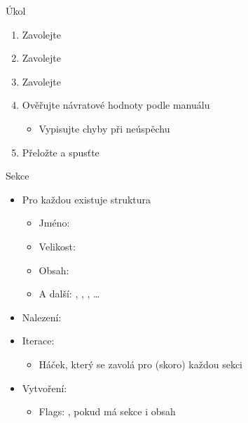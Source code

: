\begin{frame}{Úkol}

  \begin{enumerate}
    \item Zavolejte 
    \item Zavolejte 
    \item Zavolejte 

    \item Ověřujte návratové hodnoty podle manuálu
    \begin{itemize}
      \item Vypisujte chyby při neúspěchu
    \end{itemize}

    \item Přeložte a spusťte
  \end{enumerate}

\end{frame}

\begin{frame}{Sekce}

  \begin{itemize}
    \item Pro každou existuje struktura 
    \begin{itemize}
      \item Jméno: 
      \item Velikost: 
      \item Obsah: 
      \item A další: , , , \dots
    \end{itemize}

    \pause

    \item Nalezení: 

    \pause

    \item Iterace: 
    \begin{itemize}
      \item Háček, který se zavolá pro (skoro) každou sekci
    \end{itemize}

    \pause

    \item Vytvoření: 
    \begin{itemize}
      \item Flags: , pokud má sekce i obsah
    \end{itemize}
  \end{itemize}

\end{frame}

